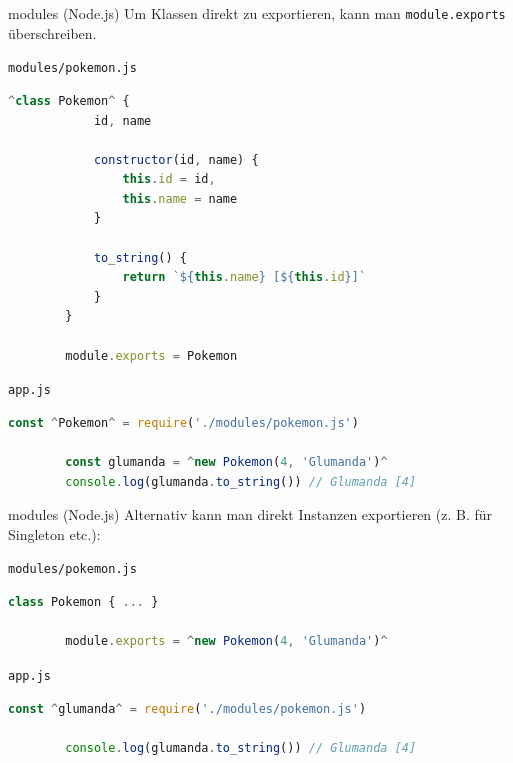\begin{example}{modules (Node.js)}
    Um Klassen direkt zu exportieren, kann man \texttt{module.exports} überschreiben.

    \texttt{modules/pokemon.js}
    \begin{lstlisting}[language=JavaScript]
        ^class Pokemon^ {
            id, name

            constructor(id, name) {
                this.id = id,
                this.name = name
            }

            to_string() {
                return `${this.name} [${this.id}]`
            }
        }

        module.exports = Pokemon
    \end{lstlisting}

    \texttt{app.js}
    \begin{lstlisting}[language=JavaScript]
        const ^Pokemon^ = require('./modules/pokemon.js')

        const glumanda = ^new Pokemon(4, 'Glumanda')^
        console.log(glumanda.to_string()) // Glumanda [4]
    \end{lstlisting}
\end{example}

\begin{example}{modules (Node.js)}
    Alternativ kann man direkt Instanzen exportieren (z. B. für Singleton etc.):

    \texttt{modules/pokemon.js}
    \begin{lstlisting}[language=JavaScript]
        class Pokemon { ... }

        module.exports = ^new Pokemon(4, 'Glumanda')^
    \end{lstlisting}

    \texttt{app.js}
    \begin{lstlisting}[language=JavaScript]
        const ^glumanda^ = require('./modules/pokemon.js')

        console.log(glumanda.to_string()) // Glumanda [4]
    \end{lstlisting}
\end{example}


